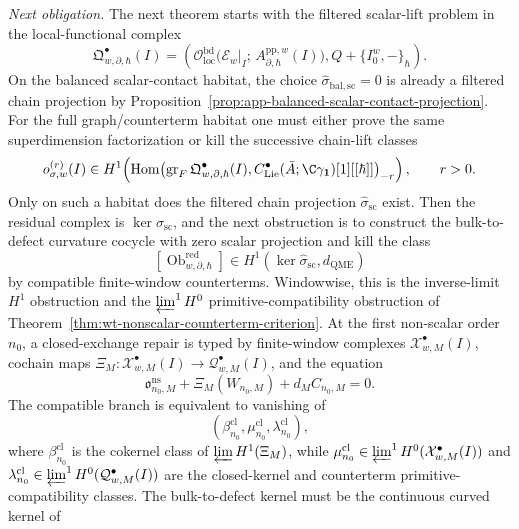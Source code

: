 \begin{stmt}
  \emph{Next obligation.} The next theorem starts with the filtered
  scalar-lift problem in the local-functional complex
  \[
    \mathfrak Q^\bullet_{w,\partial,\hbar}(I)
      =
      \left(
      \mathcal O_{\mathrm{loc}}^{\mathrm{bd}}\bigl(
        \mathcal E_w|_I;\,A^{\mathrm{pp},w}_{\partial,\hbar}(I)\bigr),
      Q+\{I_0^w,-\}_\hbar
      \right).
  \]
  On the balanced scalar-contact habitat, the choice
  \(\widehat\sigma_{\mathrm{bal,sc}}=0\) is already a filtered chain
  projection by
  Proposition~\ref{prop:app-balanced-scalar-contact-projection}.  For
  the full graph/counterterm habitat one must either prove the same
  superdimension factorization or kill the successive chain-lift classes
  \[
    o_{\sigma,w}^{(r)}(I)\in
    H^1\!\left(
      \operatorname{Hom}\bigl(
        \operatorname{gr}_{F}
        \mathfrak Q^\bullet_{w,\partial,\hbar}(I),
        C^\bullet_{\mathrm{Lie}}(\bar A;\C\gamma_{\mathbf 1})[1][[\hbar]]
      \bigr)_{-r}
    \right),\qquad r>0.
  \]
  Only on such a habitat does the filtered chain projection
  \(\widehat\sigma_{\mathrm{sc}}\) exist.  Then the residual complex is
  \(\ker\widehat\sigma_{\mathrm{sc}}\), and the next obstruction is to
  construct the bulk-to-defect curvature cocycle with zero scalar
  projection and kill the class
  \[
    [\operatorname{Ob}^{\mathrm{red}}_{w,\partial,\hbar}]
      \in
      H^1(\ker\widehat\sigma_{\mathrm{sc}},d_{\mathrm{QME}})
  \]
  by compatible finite-window counterterms.  Windowwise, this is the
  inverse-limit \(H^1\) obstruction and the
  \(\varprojlim^1H^0\) primitive-compatibility obstruction of
  Theorem~\ref{thm:wt-nonscalar-counterterm-criterion}.  At the first
  non-scalar order \(n_0\), a closed-exchange repair is typed by
  finite-window complexes \(\mathcal X^\bullet_{w,M}(I)\), cochain maps
  \(\Xi_M:\mathcal X^\bullet_{w,M}(I)\to
  \mathcal Q^\bullet_{w,M}(I)\), and the equation
  \[
    \mathfrak o^{\mathrm{ns}}_{n_0,M}
      +\Xi_M(W_{n_0,M})
      +d_M C_{n_0,M}=0.
  \]
  The compatible branch is equivalent to vanishing of
  \[
    \left(
      \beta^{\mathrm{cl}}_{n_0},
      \mu^{\mathrm{cl}}_{n_0},
      \lambda^{\mathrm{cl}}_{n_0}
    \right),
  \]
  where \(\beta^{\mathrm{cl}}_{n_0}\) is the cokernel class of
  \(\varprojlim H^1(\Xi_M)\), while
  \(\mu^{\mathrm{cl}}_{n_0}\in
  \varprojlim^1 H^0(\mathcal X^\bullet_{w,M}(I))\) and
  \(\lambda^{\mathrm{cl}}_{n_0}\in
  \varprojlim^1 H^0(\mathcal Q^\bullet_{w,M}(I))\) are the closed-kernel
  and counterterm primitive-compatibility classes.  The
  bulk-to-defect kernel must be the continuous curved kernel of

\end{stmt}
